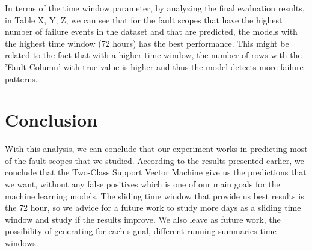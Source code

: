 In terms of the time window parameter, by analyzing the final evaluation results, in Table X, Y, Z, we can see that for the fault scopes that have the highest number of failure events in the dataset and that are predicted, the models with the highest time window (72 hours) has the best performance. This might be related to the fact that with a higher time window, the number of rows with the 'Fault Column' with true value is higher and thus the model detects more failure patterns.


\section{Conclusion} 
\label{sub:if_you_use_this_template}
With this analysis, we can conclude that our experiment works in predicting most of the fault scopes that we studied. According to the results presented earlier, we conclude that the Two-Class Support Vector Machine give us the predictions that we want, without any false positives which is one of our main goals for the machine learning models. The sliding time window that provide us best results is the 72 hour, so we advice for a future work to study more days as a sliding time window and study if the results improve. We also leave as future work, the possibility of generating for each signal, different running summaries time windows.

